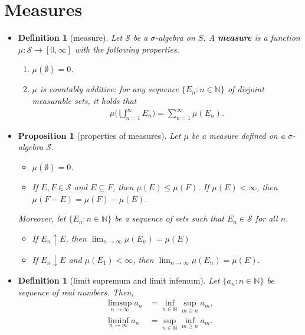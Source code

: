 \documentclass[10pt]{article}
\newtheorem{definition}[lemma]{Definition}
\newtheorem{proposition}[lemma]{Proposition}
\numberwithin{lemma}{section}
\newcommand{\mcal}[1]{\mathcal{#1}}
\newcommand{\Nat}{\mathbb{N}}
\begin{document}
\section{Measures}

\begin{itemize}
  \item 
  \begin{definition}[measure]
    Let $\mcal{S}$ be a $\sigma$-algebra on $S$. A {\bf measure} is a function $\mu: \mcal{S} \rightarrow [0, \infty]$ with the following properties.
    \begin{enumerate}
      \item $\mu(\emptyset) = 0$.
      \item $\mu$ is countably additive: for any sequence $\{E_n : n \in \Nat \}$ of disjoint measurable sets, it holds that
      \begin{align*}
        \mu\bigg( \bigcup_{n=1}^\infty E_n \bigg) = \sum_{n=1}^\infty \mu(E_n).
      \end{align*}
    \end{enumerate}
  \end{definition}
  
  \item \begin{proposition}[properties of measures]
    Let $\mu$ be a measure defined on a $\sigma$-algebra $\mcal{S}$. 
    \begin{itemize}
      \item[(a)] $\mu(\emptyset) = 0$.
      
      \item[(b)] If $E, F \in \mcal{S}$ and $E \subseteq F$, then $\mu(E) \leq \mu(F)$. If $\mu(E) < \infty$, then $\mu(F - E) = \mu(F) - \mu(E)$.
    \end{itemize}
    Moreover, let $\{ E_n : n \in \Nat \}$ be a sequence of sets such that $E_n \in \mcal{S}$ for all $n$.
    \begin{itemize}
      \item[(c)] If $E_n \uparrow E$, then $\lim_{n \rightarrow \infty} \mu(E_n) = \mu(E)$
      
      \item[(d)] If $E_n \downarrow E$ and $\mu(E_1) < \infty$, then $\lim_{n \rightarrow \infty} \mu(E_n) = \mu(E)$.
    \end{itemize}
  \end{proposition}

  \item \begin{definition}[limit supremum and limit infemum]
    Let $\{ a_n : n \in \Nat \}$ be sequence of real numbers. Then,
    \begin{align*}
      \limsup_{n \rightarrow \infty} a_n &= \inf_{n \in \Nat} \sup_{m \geq n} a_m, \\
      \liminf_{n \rightarrow \infty} a_n &= \sup_{n \in \Nat} \inf_{m \geq n} a_m.
    \end{align*}
  \end{definition}


\end{itemize}
\end{document}
